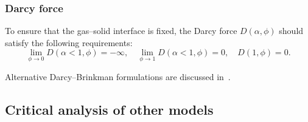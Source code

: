 \documentclass[final]{elsarticle} %
\begin{document}
\subsubsection{Darcy force}

To ensure that the gas--solid interface is fixed,
the Darcy force $D(\alpha,\phi)$ should satisfy the following requirements:
\begin{equation}\label{eq:Darcy}
    \lim_{\phi\to0} D(\alpha<1,\phi) = -\infty, \quad
    \lim_{\phi\to1} D(\alpha<1,\phi) = 0, \quad
    D(1,\phi) = 0.
\end{equation}

Alternative Darcy--Brinkman formulations are discussed in~\cite{le2006interfacial}.

\subsection{Critical analysis of other models}
\end{document}

